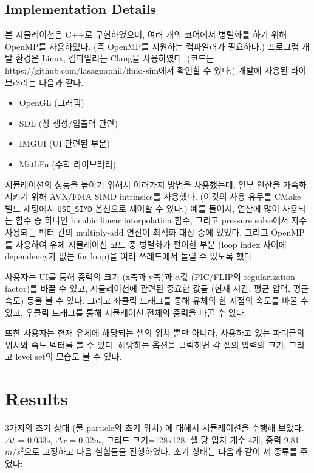 \documentclass[11pt, A4]{article}
\begin{document}
\subsection{Implementation Details}

본 시뮬레이션은 C++로 구현하였으며, 여러 개의 코어에서 병렬화를 하기 위해 OpenMP를 사용하였다. (즉 OpenMP를 지원하는 컴파일러가 필요하다.) 프로그램 개발 환경은 Linux, 컴파일러는 Clang을 사용하였다. (코드는 https://github.com/lasagnaphil/fluid-sim에서 확인할 수 있다.) 개발에 사용된 라이브러리는 다음과 같다.

\begin{itemize}
  \item OpenGL (그래픽)
  \item SDL (창 생성/입출력 관련)
  \item IMGUI (UI 관련된 부분)
  \item MathFu (수학 라이브러리)
\end{itemize}

시뮬레이션의 성능을 높이기 위해서 여러가지 방법을 사용했는데, 일부 연산을 가속화시키기 위해 AVX/FMA SIMD intrinsics를 사용했다. (이것의 사용 유무를 CMake 빌드 세팅에서 \texttt{USE\_SIMD} 옵션으로 제어할 수 있다.) 예를 들어서, 연산에 많이 사용되는 함수 중 하나인 bicubic linear interpolation 함수, 그리고 pressure solve에서 자주 사용되는 벡터 간의 multiply-add 연산이 최적화 대상 중에 있었다.  그리고 OpenMP를 사용하여 유체 시뮬레이션 코드 중 병렬화가 편이한 부분 (loop index 사이에 dependency가 없는 for loop)을 여러 쓰레드에서 돌릴 수 있도록 했다.

사용자는 UI를 통해 중력의 크기 (x축과 y축)과 $\alpha$값 (PIC/FLIP의 regularization factor)를 바꿀 수 있고, 시뮬레이션에 관련된 중요한 값들 (현재 시간, 평균 압력, 평균 속도) 등을 볼 수 있다. 그리고 좌클릭 드래그를 통해 유체의 한 지점의 속도를 바꿀 수 있고, 우클릭 드래그를 통해 시뮬레이션 전체의 중력을 바꿀 수 있다.

또한 사용자는 현재 유체에 해당되는 셀의 위치 뿐만 아니라, 사용하고 있는 파티클의 위치와 속도 벡터를 볼 수 있다. 해당하는 옵션을 클릭하면 각 셀의 압력의 크기, 그리고 level set의 모습도 볼 수 있다.

\section{Results}

3가지의 초기 상태 (물 particle의 초기 위치) 에 대해서 시뮬레이션을 수행해 보았다.$\Delta t$ = 0.033s, $\Delta x = 0.02m$, 그리드 크기=128x128, 셀 당 입자 개수 4개, 중력 9.81$m/s^2$으로 고정하고 다음 실험들을 진행하였다. 초기 상태는 다음과 같이 세 종류를 주었다:
\end{document}
